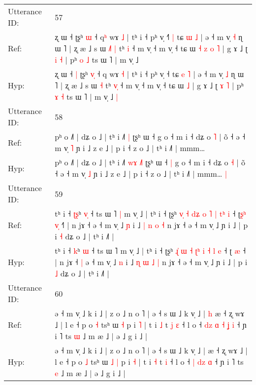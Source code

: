 \documentclass[10pt]{article}
\DeclareRobustCommand{\hl}[1]{{\textcolor{red}{#1}}}
\begin{document}
\begin{longtable}{ll}
 \\
\midrule
Utterance ID: & 57 \\
Ref: & ʐ ɯ ˧\hl{}\hl{} ʈʂʰ \hl{}\hl{ɯ} ˧ q\hl{ʰ} wɤ \hl{˩} | tʰ i ˧ pʰ v̩ ˧\hl{˥}\hl{ }\hl{|} tɕ \hl{ɯ} \hl{˩} | ə ˧ m v̩ \hl{˧} ɳ ɯ ˥ | ʐ æ ˩ s ɯ\hl{ }\hl{˩}\hl{˥} \hl{|} tʰ \hl{}\hl{i} ˧ m v̩ ˧ m v̩ ˧ tɕ ɯ\hl{ }\hl{˧}\hl{ }\hl{z}\hl{ }\hl{o} \hl{˥} | g ɤ ˩ ʈ \hl{i} \hl{˧} | pʰ \hl{o} \hl{˩} ts ɯ ˥ | m v̩ ˩\hl{}\hl{}
 \\
Hyp: & ʐ ɯ ˧\hl{ }\hl{|} ʈʂʰ \hl{v}\hl{̩} ˧ q\hl{} wɤ \hl{˧} | tʰ i ˧ pʰ v̩ ˧\hl{}\hl{}\hl{} tɕ \hl{e} \hl{˥} | ə ˧ m v̩ \hl{˩} ɳ ɯ ˥ | ʐ æ ˩ s ɯ\hl{}\hl{}\hl{} \hl{˧} tʰ \hl{v}\hl{̩} ˧ m v̩ ˧ m v̩ ˧ tɕ ɯ\hl{}\hl{}\hl{}\hl{}\hl{}\hl{} \hl{˩} | g ɤ ˩ ʈ \hl{ɤ} \hl{˥} | pʰ \hl{ɤ} \hl{˧} ts ɯ ˥ | m v̩ ˩\hl{ }\hl{|}
 \\
\midrule
Utterance ID: & 58 \\
Ref: & pʰ o ˩˥ | dʑ o ˩ | tʰ i ˩˥\hl{}\hl{}\hl{} \hl{}\hl{|} ʈʂʰ ɯ ˧\hl{}\hl{} g o ˧ m i ˧ dʑ o \hl{˥} | õ ˧ ə ˧ m v̩ \hl{˥} ɲ i ˩ z e ˩ | p i ˧ z o ˩ | tʰ i ˩˥ | mmm…\hl{}\hl{}
 \\
Hyp: & pʰ o ˩˥ | dʑ o ˩ | tʰ i ˩˥\hl{ }\hl{w}\hl{ɤ} \hl{˩}\hl{˥} ʈʂʰ ɯ ˧\hl{ }\hl{|} g o ˧ m i ˧ dʑ o \hl{˧} | õ ˧ ə ˧ m v̩ \hl{˩} ɲ i ˩ z e ˩ | p i ˧ z o ˩ | tʰ i ˩˥ | mmm…\hl{ }\hl{|}
 \\
\midrule
Utterance ID: & 59 \\
Ref: & tʰ i ˧ \hl{ʈ}\hl{ʂ}ʰ \hl{v}\hl{̩} ˧ ts ɯ ˥\hl{ }\hl{|} m v̩ ˩ | tʰ i ˧ ʈʂʰ \hl{v}\hl{̩} \hl{˧} \hl{d}\hl{ʑ}\hl{ }\hl{o} \hl{˥} \hl{|} \hl{t}\hl{ʰ} \hl{i} ˧ ʈ\hl{ʂ}\hl{ʰ} \hl{v}\hl{̩} ˧\hl{˥} | n jɤ ˧\hl{}\hl{} ə ˧ m v̩ ˩ \hl{ɲ} i ˩ \hl{|} \hl{n} \hl{o} \hl{˧} n jɤ ˧ ə ˧ m v̩ ˩ ɲ i ˩ | p i \hl{˧} dʑ o ˩ | tʰ i ˩˥ |
 \\
Hyp: & tʰ i ˧ \hl{}\hl{k}ʰ \hl{}\hl{ɯ} ˧ ts ɯ ˥\hl{}\hl{} m v̩ ˩ | tʰ i ˧ ʈʂʰ \hl{ɻ}\hl{̍} \hl{ɯ} \hl{˧}\hl{ }\hl{ʈ}\hl{ʰ} \hl{i} \hl{˧} \hl{}\hl{l} \hl{e} ˧ ʈ\hl{}\hl{} \hl{}\hl{æ} ˧\hl{} | n jɤ ˧\hl{ }\hl{|} ə ˧ m v̩ ˩ \hl{n} i ˩ \hl{ɳ} \hl{ɯ} \hl{˩} \hl{|} n jɤ ˧ ə ˧ m v̩ ˩ ɲ i ˩ | p i \hl{˩} dʑ o ˩ | tʰ i ˩˥ |
 \\
\midrule
Utterance ID: & 60 \\
Ref: & ə ˧ m v̩ ˩ k i ˩ | z o ˩ n o ˥ | ə ˧ s ɯ ˩ k v̩ ˩ |\hl{ }\hl{h} æ ˧ ʐ wɤ ˩ | l e ˧ p o \hl{˧} tsʰ ɯ\hl{}\hl{} \hl{˧} p i \hl{˥} | t i \hl{˩} t\hl{ }\hl{j} \hl{ɛ} ˧ l o ˧\hl{ }\hl{d}\hl{z} \hl{ɑ} \hl{˧}\hl{ }\hl{ʝ} \hl{i} ˧ ɲ i ˥ ts \hl{ɯ} ˩ m æ ˩ | ə ˩ g i ˩ |
 \\
Hyp: & ə ˧ m v̩ ˩ k i ˩ | z o ˩ n o ˥ | ə ˧ s ɯ ˩ k v̩ ˩ |\hl{}\hl{} æ ˧ ʐ wɤ ˩ | l e ˧ p o \hl{˩} tsʰ ɯ\hl{ }\hl{˩} \hl{|} p i \hl{˧} | t i \hl{˧} t\hl{}\hl{} \hl{i} ˧ l o ˧\hl{}\hl{}\hl{} \hl{|} \hl{}\hl{d}\hl{z} \hl{ɑ} ˧ ɲ i ˥ ts \hl{e} ˩ m æ ˩ | ə ˩ g i ˩ |

\end{longtable}
\end{document}
